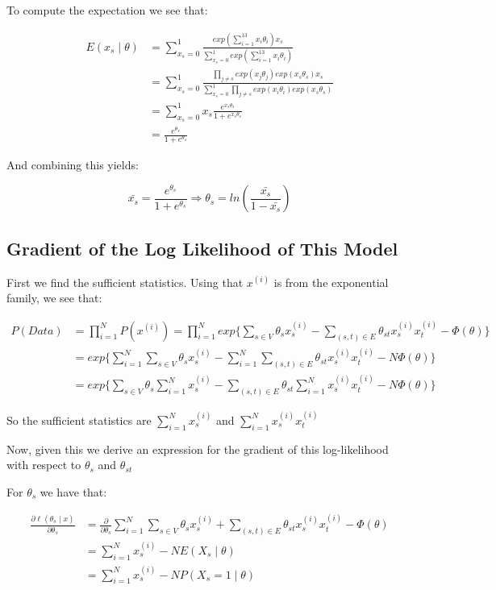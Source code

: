 \documentclass[]{article}
\begin{document}
To compute the expectation we see that:

\begin{align*}
E(x_s \mid \theta) &= \sum_{x_s=0}^{1} \frac{exp( \sum_{i=1}^{13} x_i \theta_i) x_s}{\sum_{x_s=0}^{1} exp(\sum_{i=1}^{13} x_i \theta_i)} \\
&= \sum_{x_s=0}^{1} \frac{\prod_{j \ne s} exp( x_j \theta_j) exp( x_s \theta_s) x_s}{\sum_{x_s=0}^{1} \prod_{j \ne s} exp(x_i \theta_i) exp(x_s \theta_s)}\\
&= \sum_{x_s=0}^{1} x_s \frac{e^{x_s \theta_s}}{1+e^{x_s \theta_s}}  \\
&= \frac{e^{\theta_s}}{1+e^{\theta_s}}
\end{align*}

And combining this yields:

\[
\bar{x_s} = \frac{e^{\theta_s}}{1+e^{\theta_s}} \Rightarrow \theta_s = ln(  \frac{\bar{x_s}}{1 - \bar{x_s}} )
\]

\subsection{Gradient of the Log Likelihood of This
Model}\label{gradient-of-the-log-likelihood-of-this-model}

First we find the sufficient statistics. Using that \(x^{(i)}\) is from
the exponential family, we see that:

\begin{align*}
P(Data) &= \prod^{N}_{i=1} P(x^{(i)}) = \prod^{N}_{i=1} exp \biggl\{\sum_{s \in V}  \theta_{s}x_{s}^{(i)} - \sum_{(s,t) \in E}  \theta_{st} x_{s}^{(i)} x_{t}^{(i)}  - \Phi(\theta) \biggl\} \\
&= exp \biggl\{\sum_{i=1}^N \sum_{s \in V}  \theta_{s}x_{s}^{(i)} - \sum_{i=1}^N \sum_{(s,t) \in E}  \theta_{st} x_{s}^{(i)} x_{t}^{(i)}  - N \Phi(\theta) \biggl\} \\
&= exp \biggl\{ \sum_{s \in V}  \theta_{s} \sum_{i=1}^N x_{s}^{(i)} - \sum_{(s,t) \in E}  \theta_{st} \sum_{i=1}^N x_{s}^{(i)} x_{t}^{(i)}  - N \Phi(\theta) \biggl\}
\end{align*}

So the sufficient statistics are \(\sum_{i=1}^N x_{s}^{(i)}\) and
\(\sum_{i=1}^N x_{s}^{(i)} x_{t}^{(i)}\)

Now, given this we derive an expression for the gradient of this
log-likelihood with respect to \(\theta_s\) and \(\theta_{st}\)

For \(\theta_s\) we have that:

\begin{align*}
\frac{\partial \ell(\theta_s \mid x)}{\partial \theta_s} &= \frac{\partial}{\partial \theta_s} \sum_{i=1}^N \sum_{s \in V}  \theta_{s}x_{s}^{(i)} + \sum_{(s,t) \in E} \theta_{st}x_{s}^{(i)}x_{t}^{(i)}-\Phi(\theta) \\
&=\sum_{i=1}^N x_{s}^{(i)} - N E(X_s \mid \theta) \\
&=\sum_{i=1}^N x_{s}^{(i)} - N P(X_s = 1 \mid \theta)
\end{align*}
\end{document}
